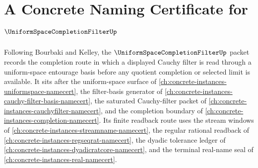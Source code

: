 \chapter{A Concrete Naming Certificate for $\UniformSpaceCompletionFilterUp$}
\label{ch:concrete-instances-uniform-space-completion-filter-namecert}

Following Bourbaki and Kelley, the $\UniformSpaceCompletionFilterUp$ packet records the completion route in which a displayed Cauchy filter is read through a uniform-space entourage basis before any quotient completion or selected limit is available. It sits after the uniform-space surface of \autoref{ch:concrete-instances-uniformspace-namecert}, the filter-basis generator of \autoref{ch:concrete-instances-cauchy-filter-basis-namecert}, the saturated Cauchy-filter packet of \autoref{ch:concrete-instances-cauchyfilter-namecert}, and the completion boundary of \autoref{ch:concrete-instances-completion-namecert}. Its finite readback route uses the stream windows of \autoref{ch:concrete-instances-streamname-namecert}, the regular rational readback of \autoref{ch:concrete-instances-regseqrat-namecert}, the dyadic tolerance ledger of \autoref{ch:concrete-instances-dyadicratcore-namecert}, and the terminal real-name seal of \autoref{ch:concrete-instances-real-namecert}.

